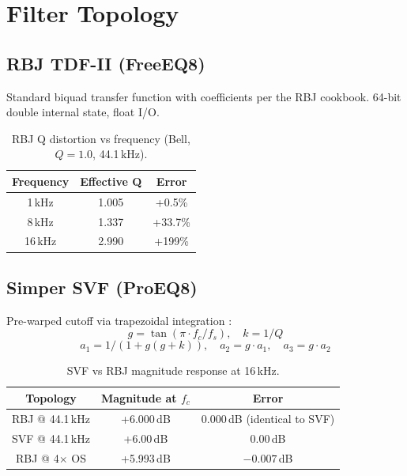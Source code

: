 \documentclass[11pt,a4paper]{article}
\begin{document}
\section{Filter Topology}

\subsection{RBJ TDF-II (FreeEQ8)}
Standard biquad transfer function with coefficients per the RBJ cookbook. 64-bit double internal state, float I/O.

\begin{table}[ht]
  \caption{RBJ Q distortion vs frequency (Bell, $Q=1.0$, 44.1\,kHz).}
  \centering
  \begin{tabular}{ccc}\toprule
    Frequency & Effective Q & Error \\\midrule
    1\,kHz & 1.005 & +0.5\% \\
    8\,kHz & 1.337 & +33.7\% \\
    16\,kHz & 2.990 & +199\% \\\bottomrule
  \end{tabular}
  \label{tab:qdistortion}
\end{table}

\subsection{Simper SVF (ProEQ8)}
Pre-warped cutoff via trapezoidal integration \cite{simper}:
\begin{equation}
g = \tan(\pi \cdot f_c / f_s), \quad k = 1/Q
\end{equation}
\begin{equation}
a_1 = 1 / (1 + g(g + k)), \quad a_2 = g \cdot a_1, \quad a_3 = g \cdot a_2
\end{equation}

\begin{table}[ht]
  \caption{SVF vs RBJ magnitude response at 16\,kHz.}
  \centering
  \begin{tabular}{ccc}\toprule
    Topology & Magnitude at $f_c$ & Error \\\midrule
    RBJ @ 44.1\,kHz & +6.000\,dB & $0.000$\,dB (identical to SVF) \\
    SVF @ 44.1\,kHz & +6.00\,dB & 0.00\,dB \\
    RBJ @ 4$\times$ OS & +5.993\,dB & $-0.007$\,dB \\\bottomrule
  \end{tabular}
  \label{tab:svfvsrbj}
\end{table}
\end{document}
